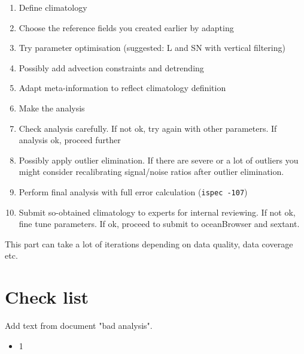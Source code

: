 \documentclass[a4paper,12pt,oneside,notitlepage]{book}
\newcommand{\file}[1]{\texttt{\color{MidnightBlue}{#1}}}
\newcommand{\command}[1]{\texttt{\color{RedOrange}{#1}}}
\begin{document}
\begin{enumerate}
\item Define climatology \file{yearlist, monthlist, varlist}
\item Choose the reference fields you created earlier by adapting \file{constandrefe}
\item Try parameter optimisation (suggested: L and SN with vertical filtering)
\item Possibly add advection constraints and detrending
\item Adapt meta-information to reflect climatology definition
\item Make the analysis
\item Check analysis carefully. If not ok, try again with other parameters. If analysis ok, proceed further
\item Possibly apply outlier elimination. If there are severe or a lot of outliers you might consider recalibrating signal/noise ratios after outlier elimination.

\item Perform final analysis with full error calculation ({\tt ispec -107})
\item Submit so-obtained climatology to experts for internal reviewing. If not ok, fine tune parameters. If ok, proceed to submit to oceanBrowser and sextant.
\end{enumerate}


This part can take a lot of iterations depending on data quality, data coverage etc.


\section{Check list}

Add text from document "bad analysis".

\begin{itemize}
\item[\checkmark] 1
\end{itemize}





\end{document}
